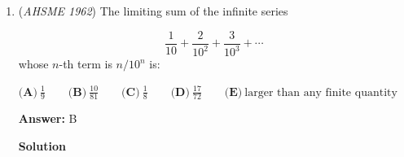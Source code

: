 \begin{enumerate}
 



\textbf{Solution 2}

We connect all the medians of the triangle. We know that the ratio of the vertice to orthocenter / median is in a $2:3$ ratio. For convenience, call the orthocenter $O$, and label the triangle $\triangle ABC$ such that the median from $A$ to $BC$ is 3 and the median from $B$ to $AC$ is 6. Then, $BO$ is 4 and $AO$ is 2. Let us call the portion of the third median that goes from $O$ to $AB$ have length $x$, and and $OC$ have length $2x$. Note that the median from $O$ to $AB$ in $\triangle AOB$ is equal to $x$. 

 Note that the medians split the triangle into 6 triangles of equal area, so $\triangle AOB$ has area equal to $\frac{1}{3}$ of $\triangle ABC = \sqrt{15}$. Let $AB=2s$. Using Herons*, we get:

 
 \[15=(3+s)(s-1)(s+1)(3-s)\]
 \[=(9-s^2)(s^2-1)\]

 We can see that $s^2=4$, meaning that $s$ is 2 and $AB=4$. We can then use Stewart's to find the length of the median from $O$, since we know the median cuts $AB$ into segments each of length $2$. We get:

 
 \[(2^2)(4)+4x^2=(4^2)(2)+(2^2)(2)\]
 \[16+4x^2=32+8\]
 \[4x^2=24\]
 \[x^2=6\]
 \[x=\sqrt{6}\]

 Since the length of the actual median from $C$ is equal to $3$, we have that the answer is $\boxed{3\sqrt{6}}$.

 
            \begin{itemize}
        \item If anyone has a better method of either finding $AB$ or the median of $AOB$ from $O$, please feel free to edit
            \end{itemize}
            


	\item (\textit{AHSME 1962}) The limiting sum of the infinite series

 \[\frac{1}{10} + \frac{2}{10^2} + \frac{3}{10^3} + \cdots\]
whose $n$-th term is $n/10^n$ is:


 $\textbf{(A)}\ \frac{1}{9} \qquad  \textbf{(B)}\ \frac{10}{81} \qquad  \textbf{(C)}\ \frac{1}{8} \qquad  \textbf{(D)}\ \frac{17}{72} \qquad  \textbf{(E)}\ \text{larger than any finite quantity}$

 \textbf{Answer: }B



\textbf{Solution}


\end{enumerate}
